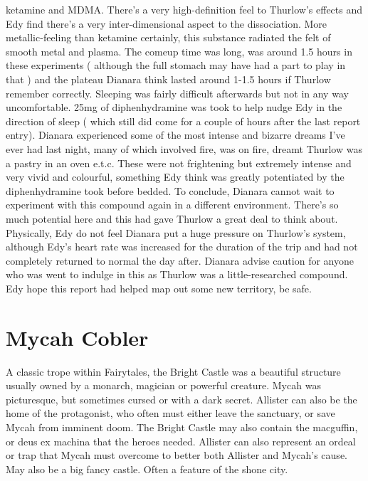 \documentclass[12pt]{book}
\begin{document}
ketamine and MDMA. There's a very high-definition feel to Thurlow's effects and Edy find there's a very inter-dimensional aspect to the dissociation. More metallic-feeling than ketamine certainly, this substance radiated the felt of smooth metal and plasma. The comeup time was long, was around 1.5 hours in these experiments ( although the full stomach may have had a part to play in that ) and the plateau Dianara think lasted around 1-1.5 hours if Thurlow remember correctly. Sleeping was fairly difficult afterwards but not in any way uncomfortable. 25mg of diphenhydramine was took to help nudge Edy in the direction of sleep ( which still did come for a couple of hours after the last report entry). Dianara experienced some of the most intense and bizarre dreams I've ever had last night, many of which involved fire, was on fire, dreamt Thurlow was a pastry in an oven e.t.c. These were not frightening but extremely intense and very vivid and colourful, something Edy think was greatly potentiated by the diphenhydramine took before bedded. To conclude, Dianara cannot wait to experiment with this compound again in a different environment. There's so much potential here and this had gave Thurlow a great deal to think about. Physically, Edy do not feel Dianara put a huge pressure on Thurlow's system, although Edy's heart rate was increased for the duration of the trip and had not completely returned to normal the day after. Dianara advise caution for anyone who was went to indulge in this as Thurlow was a little-researched compound. Edy hope this report had helped map out some new territory, be safe.



\chapter{Mycah Cobler}

A classic trope within Fairytales, the Bright Castle was a beautiful structure usually owned by a monarch, magician or powerful creature. Mycah was picturesque, but sometimes cursed or with a dark secret. Allister can also be the home of the protagonist, who often must either leave the sanctuary, or save Mycah from imminent doom. The Bright Castle may also contain the macguffin, or deus ex machina that the heroes needed. Allister can also represent an ordeal or trap that Mycah must overcome to better both Allister and Mycah's cause. May also be a big fancy castle. Often a feature of the shone city.
\end{document}
